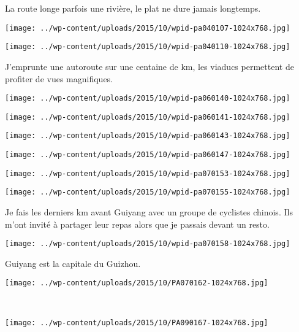  La route longe parfois une rivière, le plat ne dure jamais longtemps. 
\begin{center} \texttt{[image: ../wp-content/uploads/2015/10/wpid-pa040107-1024x768.jpg]} \end{center}
\begin{center} \texttt{[image: ../wp-content/uploads/2015/10/wpid-pa040110-1024x768.jpg]} \end{center}

  J'emprunte une autoroute sur une centaine de km, les viaducs permettent de profiter de vues magnifiques. 
\begin{center} \texttt{[image: ../wp-content/uploads/2015/10/wpid-pa060140-1024x768.jpg]} \end{center}
\begin{center} \texttt{[image: ../wp-content/uploads/2015/10/wpid-pa060141-1024x768.jpg]} \end{center}
\begin{center} \texttt{[image: ../wp-content/uploads/2015/10/wpid-pa060143-1024x768.jpg]} \end{center}
\begin{center} \texttt{[image: ../wp-content/uploads/2015/10/wpid-pa060147-1024x768.jpg]} \end{center}
\begin{center} \texttt{[image: ../wp-content/uploads/2015/10/wpid-pa070153-1024x768.jpg]} \end{center}
\begin{center} \texttt{[image: ../wp-content/uploads/2015/10/wpid-pa070155-1024x768.jpg]} \end{center}

 Je fais les derniers km avant Guiyang avec un groupe de cyclistes chinois. Ils m'ont invité à partager leur repas alors que je passais devant un resto. 
\begin{center} \texttt{[image: ../wp-content/uploads/2015/10/wpid-pa070158-1024x768.jpg]} \end{center}
\vspace{-\topsep}
\pagebreak
 
 Guiyang est la capitale du Guizhou. \\
 \begin{center} \texttt{[image: ../wp-content/uploads/2015/10/PA070162-1024x768.jpg]} \end{center}
 ~
\begin{center} \texttt{[image: ../wp-content/uploads/2015/10/PA090167-1024x768.jpg]} \end{center}
\vspace{-\topsep}
\pagebreak
 
